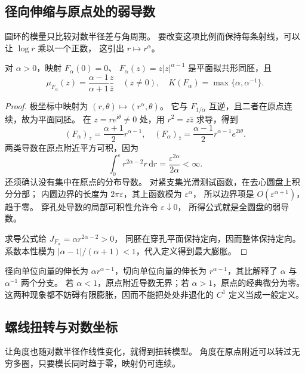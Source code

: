 \subsection{径向伸缩与原点处的弱导数}
\label{b3:subsec:B0302}

圆环的模量只比较对数半径差与角周期。
要改变这项比例而保持每条射线，可以让 \(\log r\) 乘以一个正数，
这引出 \(r\mapsto r^\alpha\)。

\begin{proposition}[径向伸缩]\label{b3:prop:B-radial-stretch}
对 \(\alpha>0\)，映射 \(F_\alpha(0)=0\)、
\(F_\alpha(z)=z|z|^{\alpha-1}\) 是平面拟共形同胚，且
\[
 \mu_{F_\alpha}(z)=\frac{\alpha-1}{\alpha+1}\frac z{\bar z}\quad(z\ne0),
 \quad K(F_\alpha)=\max\{\alpha,\alpha^{-1}\}.
\]
\end{proposition}
\begin{proof}
极坐标中映射为 \((r,\theta)\mapsto(r^\alpha,\theta)\)。
它与 \(F_{1/\alpha}\) 互逆，且二者在原点连续，故为平面同胚。
在 \(z=re^{\mathrm i\theta}\ne0\) 处，用 \(r^2=z\bar z\) 求导，得到
\[
 (F_\alpha)_z=\frac{\alpha+1}2 r^{\alpha-1},\quad
 (F_\alpha)_{\bar z}=\frac{\alpha-1}2 r^{\alpha-1}e^{2\mathrm i\theta}.
\]
两类导数在原点附近平方可积，因为
\[
 \int_0^\varepsilon r^{2\alpha-2}r\,\mathrm dr
 =\frac{\varepsilon^{2\alpha}}{2\alpha}<\infty.
\]
还须确认没有集中在原点的分布导数。
对紧支集光滑测试函数，在去心圆盘上积分分部；
内圆边界的长度为 \(2\pi\varepsilon\)，其上函数模为 \(\varepsilon^\alpha\)，
所以边界项是 \(O(\varepsilon^{\alpha+1})\)，趋于零。
穿孔处导数的局部可积性允许令 \(\varepsilon\downarrow0\)，
所得公式就是全圆盘的弱导数。

求导公式给 \(J_{F_\alpha}=\alpha r^{2\alpha-2}>0\)，
同胚在穿孔平面保持定向，因而整体保持定向。
系数本性模为 \(|\alpha-1|/(\alpha+1)<1\)，代入定义得到最大膨胀。
\end{proof}
径向单位向量的伸长为 \(\alpha r^{\alpha-1}\)，切向单位向量的伸长为
\(r^{\alpha-1}\)，其比解释了 \(\alpha\) 与 \(\alpha^{-1}\) 两个分支。
若 \(\alpha<1\)，原点附近导数无界；若 \(\alpha>1\)，原点的经典微分为零。
这两种现象都不妨碍有限膨胀，因而不能把处处非退化的 \(C^1\) 定义当成一般定义。

\subsection{螺线扭转与对数坐标}
\label{b3:subsec:B0303}

让角度也随对数半径作线性变化，就得到扭转模型。
角度在原点附近可以转过无穷多圈，只要模长同时趋于零，映射仍可连续。

